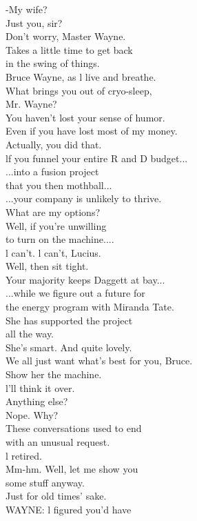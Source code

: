 \documentclass{article}
\begin{document}
\begin{multicols}{3}
-My wife?\\
Just you, sir?\\
Don't worry, Master Wayne.\\
Takes a little time to get back\\
in the swing of things.\\
Bruce Wayne, as l live and breathe.\\
What brings you out of cryo-sleep,\\
Mr. Wayne?\\
You haven't lost your sense of humor.\\
Even if you have lost most of my money.\\
Actually, you did that.\\
lf you funnel your entire R and D budget...\\
...into a fusion project\\
that you then mothball...\\
...your company is unlikely to thrive.\\
What are my options?\\
Well, if you're unwilling\\
to turn on the machine....\\
l can't. l can't, Lucius.\\
Well, then sit tight.\\
Your majority keeps Daggett at bay...\\
...while we figure out a future for\\
the energy program with Miranda Tate.\\
She has supported the project\\
all the way.\\
She's smart. And quite lovely.\\
We all just want what's best for you, Bruce.\\
Show her the machine.\\
l'll think it over.\\
Anything else?\\
Nope. Why?\\
These conversations used to end\\
with an unusual request.\\
l retired.\\
Mm-hm. Well, let me show you\\
some stuff anyway.\\
Just for old times' sake.\\
WAYNE: l figured you'd have\\

\end{multicols}
\end{document}
